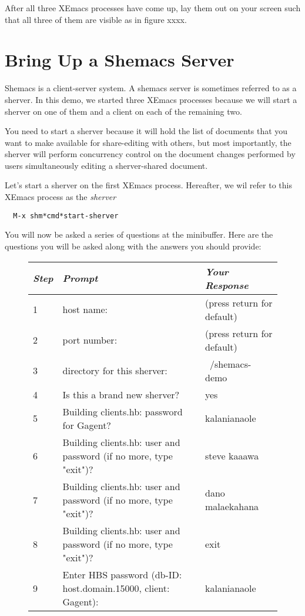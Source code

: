 After all three XEmacs processes have come up, lay them out on your
screen such that all three of them are visible as in figure xxxx.

\section{Bring Up a Shemacs Server}

Shemacs is a client-server system.  A shemacs server is sometimes referred
to as a sherver.  In this demo, we started three XEmacs processes because
we will start a sherver on one of them and a client on each of the
remaining two.

You need to start a sherver because it will hold the list of documents that
you want to make available for share-editing with others, but most
importantly, the sherver will perform concurrency control on the document
changes performed by users simultaneously editing a sherver-shared
document.

Let's start a sherver on the first XEmacs process.  Hereafter, we wil refer to 
this XEmacs process as the {\it sherver\/}

\small\begin{verbatim}
  M-x shm*cmd*start-sherver
\end{verbatim}\normalsize

You will now be asked a series of questions at the minibuffer.  Here are
the questions you will be asked along with the answers you should provide:

\small
\begin{figure}[htpb]
\begin{center}
\begin{tabular} {|l|l|l|} \hline
{\em Step} & {\em Prompt}  & {\em Your Response} \\ \hline
1 & host name: & (press return for default) \\
2 & port number: & (press return for default) \\
3 & directory for this sherver: & ~/shemacs-demo \\
4 & Is this a brand new sherver? & yes \\
5 & Building clients.hb: password for Gagent?  & kalanianaole \\
6 & Building clients.hb: user and password (if no more, type "exit")? &
steve kaaawa \\
7 & Building clients.hb: user and password (if no more, type "exit")? &
dano malaekahana \\
8 & Building clients.hb: user and password (if no more, type "exit")? &
exit \\
9 & Enter HBS password (db-ID: host.domain.15000, client: Gagent): &
kalanianaole \\
\hline
\end{tabular}
\end{center}
\end{figure}
\normalsize

